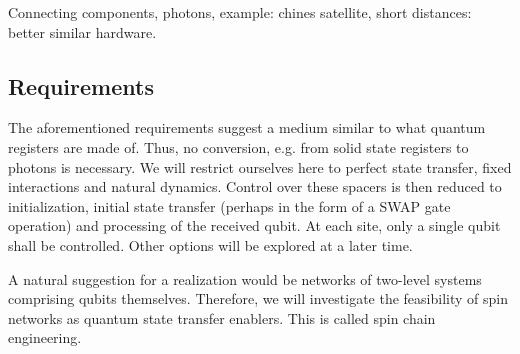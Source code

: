 \begin{center}
\end{center}

\noindent Connecting components, photons, example: chines satellite, short distances: better similar hardware.


\subsection{Requirements}

\begin{center}
\end{center}

\noindent The aforementioned requirements suggest a medium similar to what quantum registers are made of. Thus, no conversion, e.g. from solid state registers to photons is necessary. We will restrict ourselves here to perfect state transfer, fixed interactions and natural dynamics. Control over these spacers is then reduced to initialization, initial state transfer (perhaps in the form of a SWAP gate operation) and processing of the received qubit. At each site, only a single qubit shall be controlled. Other options will be explored at a later time. \par
A natural suggestion for a realization would be networks of two-level systems comprising qubits themselves. Therefore, we will investigate the feasibility of spin networks as quantum state transfer enablers. This is called spin chain engineering.

